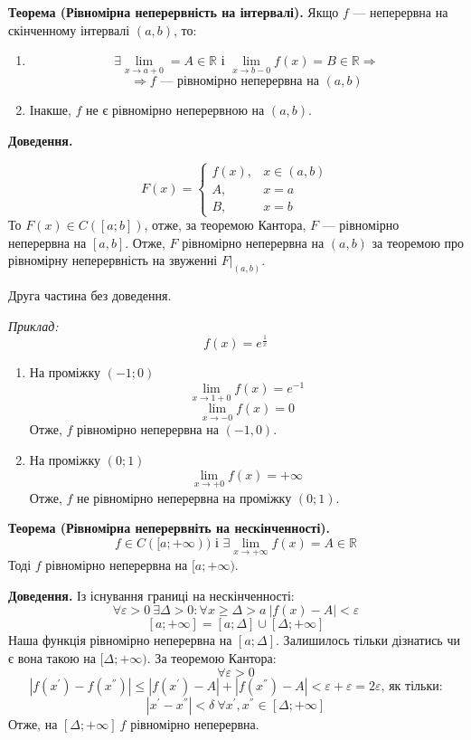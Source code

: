 \documentclass[12pt]{report}
\begin{document}
\textbf{Теорема (Рівномірна неперервність на інтервалі).} Якщо $f$ --- неперервна на скінченному інтервалі $(a,b)$, то:

\begin{enumerate}
	\item $$ \exists \lim\limits_{x \to a + 0} = A \in \mathbb{R} \textrm{ і } \lim\limits_{x \to b - 0} f(x) = B \in \mathbb{R} \Longrightarrow$$
		$$ \Longrightarrow f \textrm{ --- рівномірно неперервна на $(a,b)$}$$
	\item Інакше, $f$ не є рівномірно неперервною на $(a,b)$. 
\end{enumerate}

\textbf{Доведення.} 

$$F(x) = \begin{cases}
	f(x), & x \in (a,b) \\
	A, & x = a \\
	B, & x = b
\end{cases}$$
То $F(x) \in C ([a;b])$, отже, за теоремою Кантора, $F$ --- рівномірно неперервна на $[a,b]$. Отже, $F$ рівномірно неперервна на $(a,b)$ за теоремою про рівномірну неперервність на звуженні $F | _{(a,b)}$.

Друга частина без доведення.

\vspace{3mm}

\textit{Приклад:}
$$f(x) = e^{ \frac{1}{x}}$$

\begin{enumerate}
	\item На проміжку $ (-1; 0)$
		$$ \lim\limits_{x \to 1+0}f(x) = e^{-1} $$
		$$ \lim\limits_{x\to -0} f(x) = 0 $$
		Отже, $f$ рівномірно неперервна на $(-1, 0)$.
	\item На проміжку $(0;1)$
		$$ \lim\limits_{ x\to +0} f(x) = + \infty$$
		Отже, $f$ не рівномірно неперервна на проміжку $(0;1)$.	
\end{enumerate}

\vspace{3mm}

\textbf{Теорема (Рівномірна неперервніть на нескінченності).}
$$f \in C( [a; +\infty)) \textrm{ і } \exists \lim\limits_{x \to +\infty} f(x) = A \in \mathbb{R}$$
Тоді $f$ рівномірно неперервна на $[a; +\infty)$.

\textbf{Доведення.} 
Із існування границі на нескінченності:
$$\forall \varepsilon > 0 \ \exists \Delta > 0 : \forall x \geq \Delta > a \ |f(x) - A| < \varepsilon$$
$$[a; +\infty] = [a; \Delta] \cup [\Delta; +\infty]$$
Наша функція рівномірно неперервна на $[a; \Delta]$. Залишилось тільки дізнатись чи є вона такою на $[\Delta; +\infty)$. За теоремою Кантора:
$$\forall \varepsilon > 0$$
$$|f(x^{'}) - f(x^{''})| \leq |f(x^{'}) - A| + |f(x^{''}) - A| < \varepsilon + \varepsilon = 2 \varepsilon \textrm{, як тільки:}$$
$$|x^{'} - x^{''}| < \delta \ \forall x^{'}, x^{''} \in [\Delta; +\infty]$$
Отже, на $[\Delta; +\infty] \ f$ рівномірно неперервна.
\end{document}
